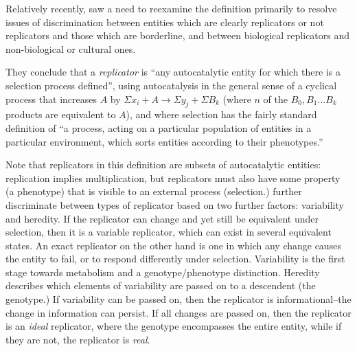 %
%

Relatively recently, \textcite{Zachar2010} saw a need to reexamine the definition primarily to resolve issues of discrimination between entities which are clearly replicators or not replicators and those which are borderline, and between biological replicators and non-biological or cultural ones. 


They conclude that a \textit{replicator} is ``any autocatalytic entity for which there is a selection process defined'', using autocatalysis in the general sense of a cyclical process that increases $A$ by $\Sigma x_i + A\rightarrow \Sigma y_j + \Sigma B_k$ (where $n$ of the ${B_0, B_1...B_k}$ products are equivalent to $A$), and where selection has the fairly standard definition of ``a process, acting on a particular population of entities in a particular environment, which sorts entities according to their phenotypes.'' \parencite[p.21]{Zachar2010} 

Note that replicators in this definition are subsets of autocatalytic entities: replication implies multiplication, but replicators must also have some property (a phenotype) that is visible to an external process (selection.)  further discriminate between types of replicator based on two further factors: variability and heredity. If the replicator can change and yet still be equivalent under selection, then it is a variable replicator, which can exist in several equivalent states. An exact replicator on the other hand is one in which any change causes the entity to fail, or to respond differently under selection. Variability is the first stage towards metabolism and a genotype/phenotype distinction. Heredity describes which elements of variability are passed on to a descendent (the genotype.) If variability can be passed on, then the replicator is informational--the change in information can persist. If all changes are passed on, then the replicator is an \emph{ideal} replicator, where the genotype encompasses the entire entity, while if they are not, the replicator is \emph{real}.

